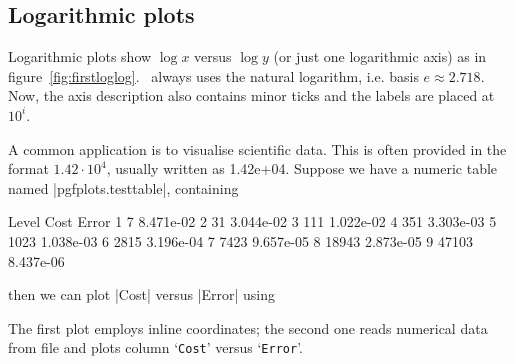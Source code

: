 \subsection{Logarithmic plots}
Logarithmic plots show $\log x$ versus $\log y$  (or just one logarithmic axis) as in figure~\ref{fig:firstloglog}. \PGFPlots\ always uses the natural logarithm, i.e. basis $e\approx2.718$. Now, the axis description also contains minor ticks and the labels are placed at $10^i$.
\begin{codeexample}[]
\end{codeexample}
A common application is to visualise scientific data. This is often provided in the format $1.42\cdot10^4$, usually written as 1.42e+04. Suppose we have a numeric table named |pgfplots.testtable|, containing
\begin{codeexample}[code only,tabsize=6]
Level Cost  Error
1     7     8.471e-02
2     31    3.044e-02
3     111   1.022e-02
4     351   3.303e-03
5     1023  1.038e-03
6     2815  3.196e-04
7     7423  9.657e-05
8     18943 2.873e-05
9     47103 8.437e-06
\end{codeexample}
then we can plot |Cost| versus |Error| using
\begin{codeexample}[]
\end{codeexample}
The first plot employs inline coordinates; the second one reads numerical data from file and plots column `\texttt{Cost}' versus `\texttt{Error}'.

